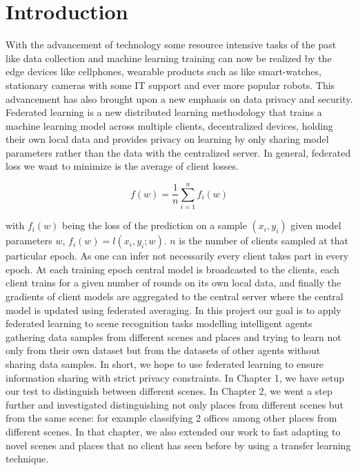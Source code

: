 \documentclass[11pt]{article}
\begin{document}
\section{Introduction}
With the advancement of technology some resource intensive tasks of the past like data collection and machine learning training can now be realized by the edge devices like cellphones, wearable products such as like smart-watches, stationary cameras with some IT support and ever more popular robots. This advancement has also brought upon a new emphasis on data privacy and security. Federated learning \cite{originalFL} is a new distributed learning methodology that trains a machine learning model across multiple clients, decentralized devices, holding their own local data and provides privacy on learning by only sharing model parameters rather than the data with the centralized server. In general, federated loss we want to minimize is the average of client losses.

\begin{equation}
f(w) = \frac{1}{n} \sum_{i=1}^{n} f_{i}(w)
\end{equation}

with $f_{i}(w)$ being the loss of the prediction on a sample $(x_i,y_i)$ given model parameters $w$, $f_{i}(w) = l(x_i,y_i;w)$. $n$ is the number of clients sampled at that particular epoch. As one can infer not necessarily every client takes part in every epoch. At each training epoch central model is broadcasted to the clients, each client trains for a given number of rounds on its own local data, and finally the gradients of client models are aggregated to the central server where the central model is updated using federated averaging. In this project our goal is to apply federated learning to scene recognition tasks modelling intelligent agents gathering data samples from different scenes and places and trying to learn not only from their own dataset but from the datasets of other agents without sharing data samples. In short, we hope to use federated learning to ensure information sharing with strict privacy constraints. In Chapter 1, we have setup our test to distinguish between different scenes. In Chapter 2, we went a step further and investigated distinguishing not only places from different scenes but from the same scene: for example classifying 2 offices among other places from different scenes. In that chapter, we also extended our work to fast adapting to novel scenes and places that no client has seen before by using a transfer learning technique.
\end{document}
